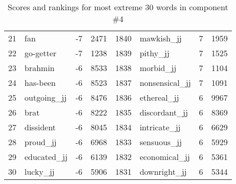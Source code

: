 \begin{table}[tbp]
\begin{tabular}{| rlr@{.}l | rlr@{.}l |}
    21 & fan & -7 & 2471    &    1840 & mawkish\_jj & 7 & 1959 \\
    22 & go-getter & -7 & 1238    &    1839 & pithy\_jj & 7 & 1525 \\
    23 & brahmin & -6 & 8533    &    1838 & morbid\_jj & 7 & 1104 \\
    24 & has-been & -6 & 8523    &    1837 & nonsensical\_jj & 7 & 1091 \\
    25 & outgoing\_jj & -6 & 8476    &    1836 & ethereal\_jj & 6 & 9967 \\
    26 & brat & -6 & 8222    &    1835 & discordant\_jj & 6 & 8369 \\
    27 & dissident & -6 & 8045    &    1834 & intricate\_jj & 6 & 6629 \\
    28 & proud\_jj & -6 & 6968    &    1833 & sensuous\_jj & 6 & 5929 \\
    29 & educated\_jj & -6 & 6139    &    1832 & economical\_jj & 6 & 5361 \\
    30 & lucky\_jj & -6 & 5906    &    1831 & downright\_jj & 6 & 5344 \\
    \hline
    \end{tabular}
    \caption{Scores and rankings for most extreme 30 words in component \#4} 
\end{table}
\clearpage
